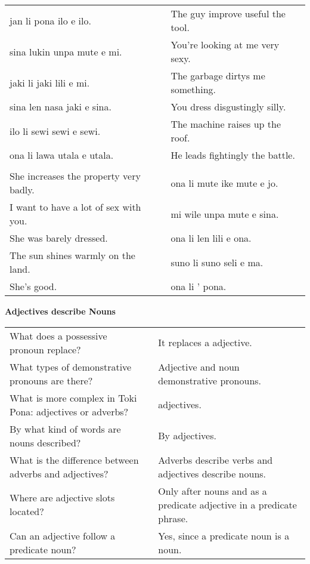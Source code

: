 \begin{supertabular}{p{5,5cm}|ll}
jan li pona ilo e ilo. && The guy improve useful the tool. \\ %
sina lukin unpa mute e mi. && You're looking at me very sexy.   \\ %
jaki li jaki lili e mi. && The garbage dirtys me something. \\ %
sina len nasa jaki e sina. && You dress disgustingly silly. \\ %
ilo li sewi sewi e sewi. && The machine raises up the roof. \\ %
ona li lawa utala e utala. && He leads fightingly the battle. \\ %
 && \\ %
She increases the property very badly. && ona li mute ike mute e jo. \\
I want to have a lot of sex with you. && mi wile unpa mute e sina. \\
She was barely dressed. && ona li len lili e ona. \\
The sun shines warmly on the land. && suno li suno seli e ma. \\
She's good. && ona li ' pona. \\
\end{supertabular} 

\textbf{Adjectives describe Nouns} 
\label{'adjectives'}

\begin{supertabular}{p{5,5cm}|ll}
What does a possessive pronoun replace? && It replaces a adjective. \\ %
What types of demonstrative pronouns are there? && Adjective and noun demonstrative pronouns.  \\ %
What is more complex in Toki Pona: adjectives or adverbs? && adjectives.  \\ %
By what kind of words are nouns described? && By adjectives.  \\ %
What is the difference between adverbs and adjectives? && Adverbs describe verbs and adjectives describe nouns. \\ %
Where are adjective slots located? && Only after nouns and as a predicate adjective in a predicate phrase. \\ %
Can an adjective follow a predicate noun? && Yes, since a predicate noun is a noun.  \\ %
\end{supertabular} 

